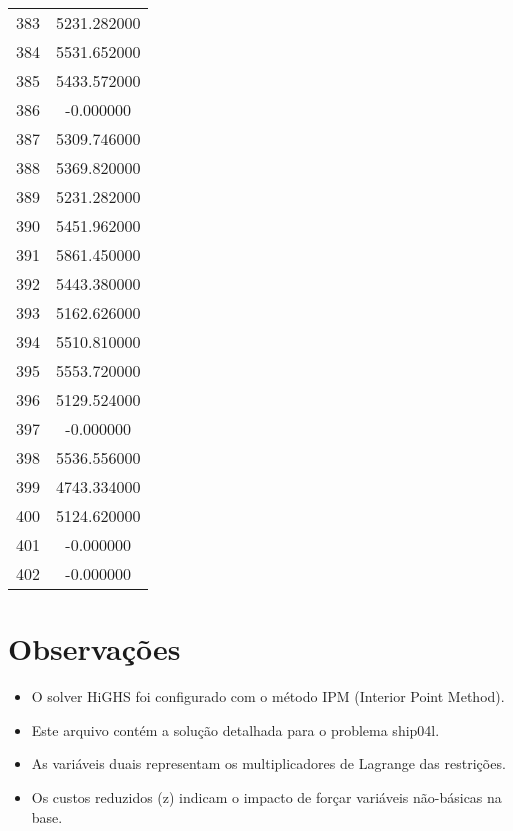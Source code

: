 \documentclass[12pt]{article}
\begin{document}
\begin{longtable}{@{}cc@{}}
383 & 5231.282000 \\
384 & 5531.652000 \\
385 & 5433.572000 \\
386 & -0.000000 \\
387 & 5309.746000 \\
388 & 5369.820000 \\
389 & 5231.282000 \\
390 & 5451.962000 \\
391 & 5861.450000 \\
392 & 5443.380000 \\
393 & 5162.626000 \\
394 & 5510.810000 \\
395 & 5553.720000 \\
396 & 5129.524000 \\
397 & -0.000000 \\
398 & 5536.556000 \\
399 & 4743.334000 \\
400 & 5124.620000 \\
401 & -0.000000 \\
402 & -0.000000 \\

\end{longtable}


\section{Observações}

\begin{itemize}
\item O solver HiGHS foi configurado com o método IPM (Interior Point Method).
\item Este arquivo contém a solução detalhada para o problema ship04l.
\item As variáveis duais representam os multiplicadores de Lagrange das restrições.
\item Os custos reduzidos (z) indicam o impacto de forçar variáveis não-básicas na base.
\end{itemize}
\end{document}
